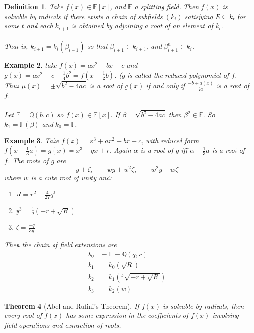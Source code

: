 \documentclass[a4paper,10pt]{article}
\newcommand{\QQ}{\mathbb{Q}}
\newcommand{\EE}{\mathbb{E}}
\newcommand{\FF}{\mathbb{F}}
\newtheorem{thm}{Theorem}
\newtheorem{Def}[thm]{Definition}
\newtheorem{eg}[thm]{Example}
\begin{document}
\begin{Def}
Take $f(x) \in \FF[x]$, and $\EE$ a splitting field. Then $f(x)$ is solvable by radicals if there exists a chain of subfields $(k_i)$ satisfying $E \subseteq k_t$ for some $t$ and each $k_{i+1}$ is obtained by adjoining a root of an element of $k_i$.   \\
\\
That is, $k_{i+1} = k_i (\beta_{i+1})$ so that $\beta_{i+1} \in k_{i+1}$, and $\beta_{i+1}^n \in k_i$. 
\end{Def}

\begin{eg}
take $f(x) = ax^2 + bx + c$ and $g(x) = ax^2 + c - \frac{1}{4} b^2 = f( x - \frac{1}{2} b)$. ($g$ is called the reduced polynomial of $f$. Thus $\mu(x) = \pm \sqrt{b^2 - 4ac}$ is a root of $g(x)$ if and only if $\frac{-b \pm \mu(x)}{2a}$ is a root of $f$. \\
\\
Let $\FF = \QQ (b ,c)$ so $f(x) \in \FF[x]$. If $\beta = \sqrt{b^2 - 4ac}$ then $\beta^2 \in \FF$. So $k_1 = \FF(\beta)$ and $k_0 = \FF$.
\end{eg}

\begin{eg}
Take $f(x) = x^3 + ax^2 + bx + c$, with reduced form $f( x - \frac{1}{3} a) = g(x) = x^3 + qx + r$. Again $\alpha$ is a root of $g$ iff $\alpha - \frac{1}{3} a$ is a root of $f$. The roots of $g$ are
\[ y + \zeta, \qquad wy + w^2 \zeta, \qquad w^2 y + w \zeta \]
where $w$ is a cube root of unity and:
\begin{enumerate}
\item $R = r^2 + \frac{4}{27} q^3$ 
\item $y^3 = \frac{1}{2}( - r + \sqrt{R})$
\item $\zeta = \frac{-q}{3y}$
\end{enumerate}

Then the chain of field extensions are 
\begin{align*}
k_0 &= \FF = \QQ ( q, r) \\
k_1 &= k_0 ( \sqrt{ R }) \\
k_2 &= k_1 ( {}^3\sqrt{-r + \sqrt{R}}) \\
k_3 &= k_2 (w)
\end{align*}
 
\end{eg}

\begin{thm}[Abel and Rufini's Theorem]
If $f(x)$ is solvable by radicals, then every root of $f(x)$ has some expression in the coefficients of $f(x)$ involving field operations and extraction of roots. 
\end{thm}
\end{document}
